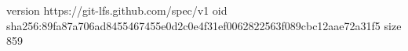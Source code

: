 version https://git-lfs.github.com/spec/v1
oid sha256:89fa87a706ad8455467455e0d2c0e4f31ef0062822563f089cbc12aae72a31f5
size 859
